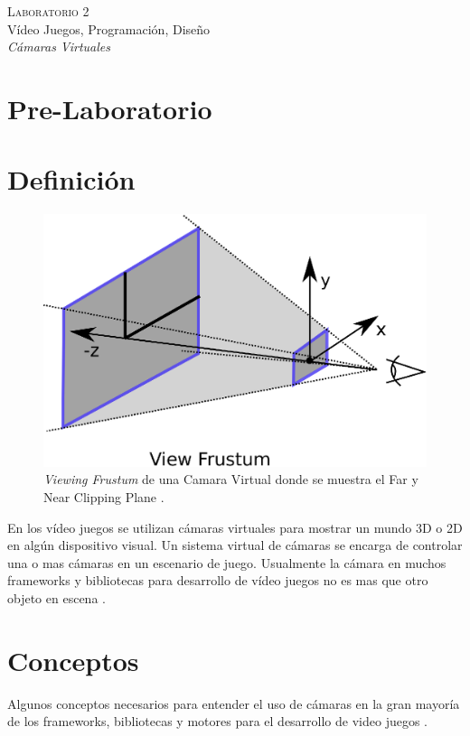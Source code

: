 \begin{center}
\textsc{\Large Laboratorio 2}~\\
{\large Vídeo Juegos, Programación, Diseño}~\\
\emph{Cámaras Virtuales}
\end{center}

\section{Pre-Laboratorio}
\section{Definición}
\begin{figure}
\includegraphics[width=\linewidth]{semana2/frustum.eps}
\caption{\emph{Viewing Frustum} de una Camara Virtual donde se muestra el Far y Near Clipping Plane \cite{microsoft_frustum}.}
\label{fig:frustum}
\end{figure}
En los vídeo juegos se utilizan cámaras virtuales para mostrar un mundo 3D o 2D en algún dispositivo visual. Un sistema virtual de cámaras se encarga de controlar una o mas cámaras en un escenario de juego. Usualmente la cámara en muchos frameworks y bibliotecas para desarrollo de vídeo juegos no es mas que otro objeto en escena \cite{fund_gamedesign}.
\newpage
\section{Conceptos}
Algunos conceptos necesarios para entender el uso de cámaras en la gran mayoría de los frameworks, bibliotecas y motores para el desarrollo de video juegos \cite{unity_camera}.
